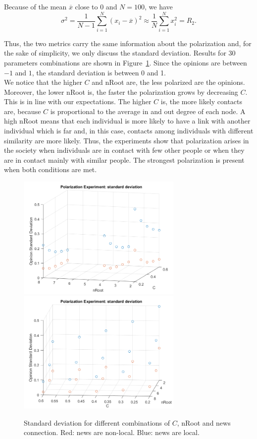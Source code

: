 Because of the mean $\overline{x}$ close to 0 and $N=100$, we have
$$ \sigma^2 = \frac{1}{N-1} \sum_{i=1}^N (x_i-\overline{x})^2 \approx \frac{1}{N} \sum_{i=1}^N x_i^2 = R_2.$$

Thus, the two metrics carry the same information about the polarization and, for the sake of simplicity, we only discuss the standard deviation. Results for 30 parameters combinations are shown in Figure~\ref{pics:pol_std}. Since the opinions are between $-1$ and $1$, the standard deviation is between 0 and 1.\\

We notice that the higher $C$ and nRoot are, the less polarized are the opinions. Moreover, the lower nRoot is, the faster the polarization grows by decreasing $C$. This is in line with our expectations. The higher $C$ is, the more likely contacts are, because $C$ is proportional to the average in and out degree of each node. A high nRoot means that each individual is more likely to have a link with another individual which is far and, in this case, contacts among individuals with different similarity are more likely. Thus, the experiments show that polarization arises in the society when individuals are in contact with few other people or when they are in contact mainly with similar people. The strongest polarization is present when both conditions are met.\\

\begin{figure}
\centering
\includegraphics[width=8cm]{Figures/pol_std1.png}
\includegraphics[width=8cm]{Figures/pol_std2.png}
\caption{Standard deviation for different combinations of $C$, nRoot and news connection. Red: news are non-local. Blue: news are local.}
\label{pics:pol_std}
\end{figure}


